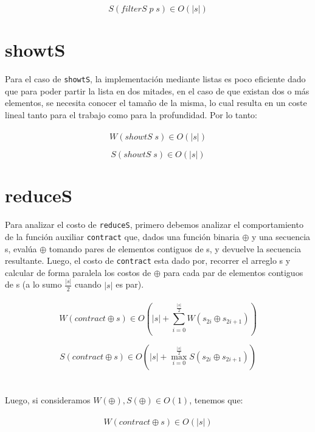 \documentclass[a4paper,10pt]{article}
\begin{document}
		\begin{equation*}
			S\left( filterS \; p \; s \right) \in O\left( \vert s \vert \right)
		\end{equation*}		
		 	
	\section*{\Large showtS}
		Para el caso de \texttt{showtS}, la implementación mediante listas es poco eficiente dado que para poder partir la lista
		en dos mitades, en el caso de que existan dos o más elementos, se necesita conocer el tamaño de la misma, lo cual resulta en un
		coste lineal tanto para el trabajo como para la profundidad. Por lo tanto:
\\
\\
		\begin{equation*}
			W\left( showtS \; s \right) \in O\left( \vert s \vert \right)
		\end{equation*}		
		
		\begin{equation*}
			S\left( showtS \; s \right) \in O\left( \vert s \vert \right)
		\end{equation*}	
\pagebreak

	\section*{\Large reduceS}
		Para analizar el costo de \texttt{reduceS}, primero debemos analizar el comportamiento de la función auxiliar \texttt{contract} que, dados una función binaria $\oplus$ y una secuencia s, evalúa $\oplus$ tomando pares de elementos contiguos de s, y devuelve la secuencia resultante.
		Luego, el costo de \texttt{contract} esta dado por, recorrer el arreglo s y calcular de forma paralela los costos de $\oplus$ para cada par de elementos contiguos de s (a lo sumo $\frac{\vert s\vert}{2}$ cuando $\vert s\vert$ es par).
\\
\\
		\begin{equation*}
			W \left( contract \oplus s \right) \in O \left( \vert s \vert + \sum_{i=0}^{\frac{\vert s\vert}{2}} W \left( s_{2i} \oplus s_{2i+1} \right) \right)
		\end{equation*}

		\begin{equation*}
			S \left( contract \oplus s \right) \in O \left( \vert s \vert + \max_{i=0}^{\frac{\vert s \vert}{2}} S \left( s_{2i} \oplus s_{2i+1} \right) \right)
		\end{equation*}
\\
\\		
		Luego, si consideramos $W(\oplus), S(\oplus) \in O(1)$, tenemos que:
\\
\\		
		\begin{equation*}
			W \left( contract \oplus s \right) \in O \left( \vert s \vert \right)
		\end{equation*}
		
\end{document}
